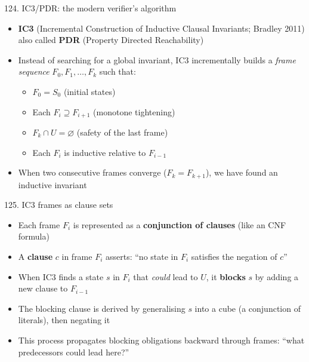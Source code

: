 \documentclass[aspectratio=169]{beamer}
\begin{document}
\begin{frame}{124. IC3/PDR: the modern verifier's algorithm}
\begin{itemize}
  \item \textbf{IC3} (Incremental Construction of Inductive Clausal Invariants; Bradley 2011) also called \textbf{PDR} (Property Directed Reachability)
  \item Instead of searching for a global invariant, IC3 incrementally builds a \emph{frame sequence} \(F_0, F_1, \ldots, F_k\) such that:
    \begin{itemize}
      \item \(F_0 = S_0\) (initial states)
      \item Each \(F_i \supseteq F_{i+1}\) (monotone tightening)
      \item \(F_k \cap U = \varnothing\) (safety of the last frame)
      \item Each \(F_i\) is inductive relative to \(F_{i-1}\)
    \end{itemize}
  \item When two consecutive frames converge (\(F_k = F_{k+1}\)), we have found an inductive invariant
\end{itemize}
\end{frame}

\begin{frame}{125. IC3 frames as clause sets}
\begin{itemize}
  \item Each frame \(F_i\) is represented as a \textbf{conjunction of clauses} (like an CNF formula)
  \item A \textbf{clause} \(c\) in frame \(F_i\) asserts: ``no state in \(F_i\) satisfies the negation of \(c\)''
  \item When IC3 finds a state \(s\) in \(F_i\) that \emph{could} lead to \(U\), it \textbf{blocks} \(s\) by adding a new clause to \(F_{i-1}\)
  \item The blocking clause is derived by generalising \(s\) into a cube (a conjunction of literals), then negating it
  \item This process propagates blocking obligations backward through frames: ``what predecessors could lead here?''
\end{itemize}
\end{frame}
\end{document}
